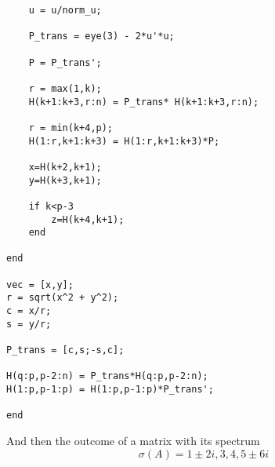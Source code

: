 \begin{verbatim}
    u = u/norm_u;

    P_trans = eye(3) - 2*u'*u;

    P = P_trans';

    r = max(1,k);
    H(k+1:k+3,r:n) = P_trans* H(k+1:k+3,r:n);

    r = min(k+4,p);
    H(1:r,k+1:k+3) = H(1:r,k+1:k+3)*P;

    x=H(k+2,k+1);
    y=H(k+3,k+1);

    if k<p-3
        z=H(k+4,k+1);
    end
    
end

vec = [x,y];
r = sqrt(x^2 + y^2);
c = x/r;
s = y/r;

P_trans = [c,s;-s,c];

H(q:p,p-2:n) = P_trans*H(q:p,p-2:n);
H(1:p,p-1:p) = H(1:p,p-1:p)*P_trans';

end
\end{verbatim}
And then the outcome of a matrix with its spectrum \[\sigma(A) = 1\pm 2i,3,4,5\pm6i\]
